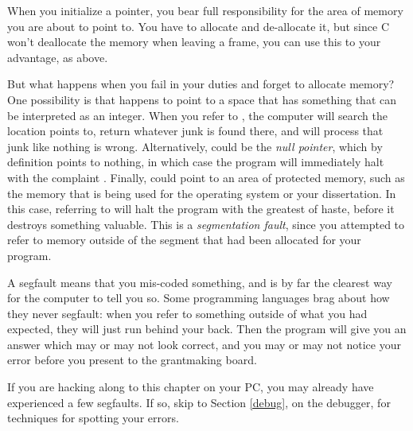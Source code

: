 When you initialize a point\-er, you bear full responsibility for the area
of memory you are about to point to. You have to allocate and de-allocate
it, but since C won't deallocate the memory when leaving a frame, you
can use this to your advantage, as above.

But what happens when you fail in your duties and forget to allocate
memory? One possibility is that  happens to point to a space
that has something that can be interpreted as an integer. When you refer
to , the computer will search the location 
points to, return whatever junk is found there, and will process that
junk like nothing is wrong. Alternatively,  could be the
{\sl null pointer},  which by definition points to nothing, in which
case the program will immediately halt with the complaint . Finally,  could point to an area of
protected memory, such as the memory that is being used for the operating
system or your dissertation. In this case, referring to  will
halt the program with the greatest of haste, before it destroys something
valuable. This is a {\sl segmentation fault}, since you attempted to refer
to memory outside of the segment that had been allocated for your program.

A segfault means that you mis-coded something, and 
is by far the clearest way for the computer to tell you so. Some
programming languages
brag about how they never segfault: when you refer to something
outside of what you had expected, they will just
run  behind your
back. Then the program will give you an answer which may or may not look
correct, and you may or may not notice your error before you present to the
grantmaking board. 

If you are hacking along to this chapter on your PC, you may already
have experienced a few segfaults. If so, skip to 
Section \ref{debug}, on the debugger, for techniques for spotting your
errors.


